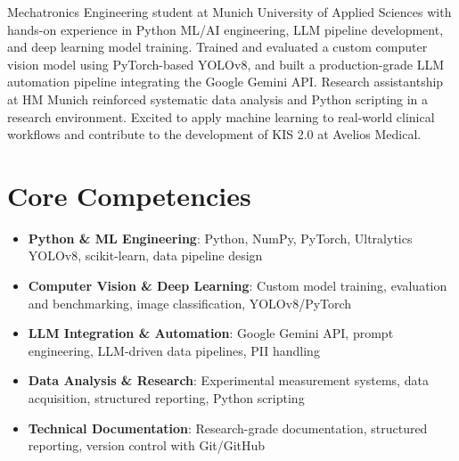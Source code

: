 \documentclass[11pt,a4paper,sans]{moderncv}
\begin{document}
\makecvtitle


\vspace{6pt}
\small{Mechatronics Engineering student at Munich University of Applied Sciences with hands-on experience in Python ML/AI engineering, LLM pipeline development, and deep learning model training. Trained and evaluated a custom computer vision model using PyTorch-based YOLOv8, and built a production-grade LLM automation pipeline integrating the Google Gemini API. Research assistantship at HM Munich reinforced systematic data analysis and Python scripting in a research environment. Excited to apply machine learning to real-world clinical workflows and contribute to the development of KIS 2.0 at Avelios Medical.}


\section{Core Competencies}
\vspace{1pt}
\begin{itemize}

\item \textbf{Python \& ML Engineering}: Python, NumPy, PyTorch, Ultralytics YOLOv8, scikit-learn, data pipeline design

\item \textbf{Computer Vision \& Deep Learning}: Custom model training, evaluation and benchmarking, image classification, YOLOv8/PyTorch

\item \textbf{LLM Integration \& Automation}: Google Gemini API, prompt engineering, LLM-driven data pipelines, PII handling

\item \textbf{Data Analysis \& Research}: Experimental measurement systems, data acquisition, structured reporting, Python scripting

\item \textbf{Technical Documentation}: Research-grade documentation, structured reporting, version control with Git/GitHub

\end{itemize}
\end{document}

